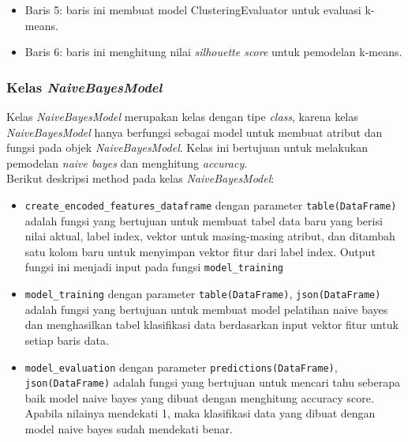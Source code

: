 \vspace{0.2cm}
\begin{itemize}
\item Baris 5: baris ini membuat model ClusteringEvaluator untuk evaluasi k-means.
\item Baris 6: baris ini menghitung nilai \textit{silhouette score} untuk pemodelan k-means.
\end{itemize}

\subsubsection{Kelas \textit{NaiveBayesModel}}
Kelas \textit{NaiveBayesModel} merupakan kelas dengan tipe \textit{class}, karena kelas \textit{NaiveBayesModel} hanya berfungsi sebagai model untuk membuat atribut dan fungsi pada objek \textit{NaiveBayesModel}. Kelas ini bertujuan untuk melakukan pemodelan \textit{naive bayes} dan menghitung \textit{accuracy}.\\

\noindent Berikut deskripsi method pada kelas \textit{NaiveBayesModel}:

\begin{itemize}

\item \texttt{create\_encoded\_features\_dataframe} dengan parameter \texttt{table(DataFrame)} adalah fungsi yang bertujuan untuk membuat tabel data baru yang berisi nilai aktual, label index, vektor untuk masing-masing atribut, dan ditambah satu kolom baru untuk menyimpan vektor fitur dari label index. Output fungsi ini menjadi input pada fungsi \texttt{model\_training}

\item \texttt{model\_training} dengan parameter \texttt{table(DataFrame)}, \texttt{json(DataFrame)} adalah fungsi yang bertujuan untuk membuat model pelatihan naive bayes dan menghasilkan tabel klasifikasi data berdasarkan input vektor fitur untuk setiap baris data.

\item \texttt{model\_evaluation} dengan parameter \texttt{predictions(DataFrame)}, \texttt{json(DataFrame)} adalah fungsi yang bertujuan untuk mencari tahu seberapa baik model naive bayes yang dibuat dengan menghitung accuracy score. Apabila nilainya mendekati 1, maka klasifikasi data yang dibuat dengan model naive bayes sudah mendekati benar.

\end{itemize}

